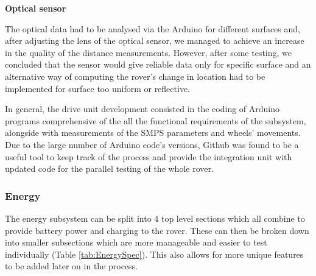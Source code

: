 \documentclass[10pt,twoside]{article}
\begin{document}
\textbf{Optical sensor}

The optical data had to be analysed via the Arduino for different surfaces and, after adjusting the lens of the optical sensor, we managed to achieve an increase in the quality of the distance measurements. However, after some testing, we concluded that the sensor would give reliable data only for specific surface and an alternative way of computing the rover’s change in location had to be implemented for surface too uniform or reflective. 

In general, the drive unit development consisted in the coding of Arduino programs comprehensive of the all the functional requirements of the subsystem, alongside with measurements of the SMPS parameters and wheels’ movements. Due to the large number of Arduino code’s versions, Github was found to be a useful tool to keep track of the process and provide the integration unit with updated code for the parallel testing of the whole rover. 

\newpage

\subsubsection{Energy}
The energy subsystem can be split into 4 top level sections which all combine to provide battery power and charging to the rover. These can then be broken down into smaller subsections which are more manageable and easier to test individually (Table \ref{tab:EnergySpec}). This also allows for more unique features to be added later on in the process. 
\end{document}

